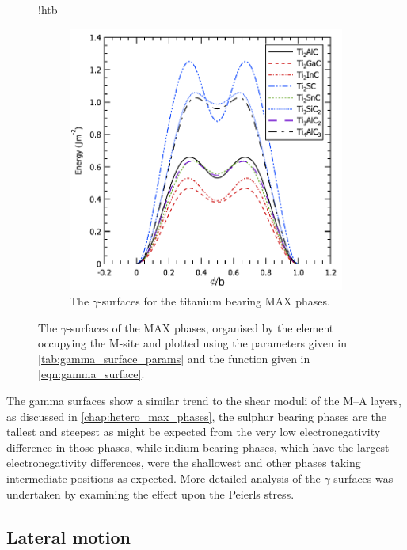 \begin{figure}{!htb}
\begin{subfigure}{5cm}
\centering
\includegraphics[width=\textwidth]{Ti_gamma_surfaces}
\caption{The $\gamma$-surfaces for the titanium bearing MAX phases.\label{fig:Ti_gamma_surfaces}}
\end{subfigure}

\captionsetup{width=12cm}
\caption[The \texorpdfstring{$\gamma$}{gamma}-surfaces of the MAX phases.]{The $\gamma$-surfaces of the MAX phases, organised by the element occupying the M-site and plotted using the parameters given in \autoref{tab:gamma_surface_params} and the function given in \autoref{eqn:gamma_surface}. \label{fig:gamma_surfaces}}
\end{figure}


The gamma surfaces show a similar trend to the shear moduli of the M--A layers, as discussed in \autoref{chap:hetero_max_phases}, the sulphur bearing phases are the tallest and steepest as might be expected from the very low electronegativity difference in those phases, while indium bearing phases, which have the largest electronegativity differences, were the shallowest and other phases taking intermediate positions as expected. More detailed analysis of the $\gamma$-surfaces was undertaken by examining the effect upon the Peierls stress.


\subsection{Lateral motion}



